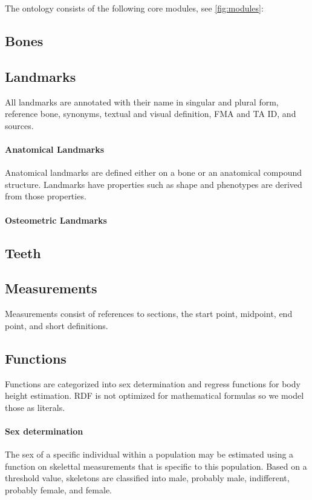 \documentclass[sw]{iosart2x}
\begin{document}
The ontology consists of the following core modules, see \cref{fig:modules}:
\subsection{Bones}\label{sec:bone}

\subsection{Landmarks}\label{sec:landmark}
All landmarks are annotated with their name in singular and plural form, reference bone, synonyms, textual and visual definition, FMA and TA ID, and sources.

\paragraph{Anatomical Landmarks}
Anatomical landmarks are defined either on a bone or an anatomical compound structure.
Landmarks have properties such as shape and phenotypes are derived from those properties.

\paragraph{Osteometric Landmarks}

\subsection{Teeth}
\subsection{Measurements}
Measurements consist of references to sections, the start point, midpoint, end point, and short definitions.

\subsection{Functions}
Functions are categorized into sex determination and regress functions for body height estimation.
RDF is not optimized for mathematical formulas so we model those as literals.

\paragraph{Sex determination}
The sex of a specific individual within a population may be estimated using a function on skelettal measurements that is specific to this population.
Based on a threshold value, skeletons are classified into male, probably male, indifferent, probably female, and female.
\end{document}
